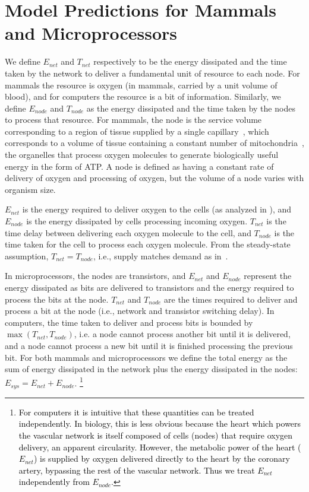 \documentclass[12pt]{article}
\newcommand{\red}[1]{\textcolor{black}{#1}}
\begin{document}
\section{Model Predictions for Mammals and Microprocessors}

We define $E_{net}$ and $T_{net}$ respectively to be the energy dissipated and
the time taken by the network to deliver a fundamental unit of resource to each node.  For
mammals the resource is oxygen (in mammals, carried by a unit volume of
blood), and for computers the resource is a bit of information.
Similarly, we define $E_{node}$ and $T_{node}$ as the energy dissipated and the
time taken by the nodes to process that resource.  For mammals, the node is
the service volume corresponding to a region of tissue supplied by a single
capillary~\cite{banavar10}, which corresponds to a volume of tissue containing a constant number
of mitochondria~\cite{west2002allometric}, the organelles that process oxygen molecules to generate
biologically useful energy in the form of ATP. A node is defined as having a constant
rate of delivery of oxygen and processing of oxygen, but the
volume of a node varies with organism size. 

$E_{net}$ is the energy required to deliver oxygen to the cells (as analyzed in
\cite{west97}), and $E_{node}$ is the energy dissipated by cells processing
incoming oxygen. $T_{net}$ is the time delay between delivering
each oxygen molecule to the cell, and $T_{node}$ is the time taken
for the cell to process each oxygen molecule. From the steady-state assumption, $T_{net} = T_{node}$,
i.e., supply matches demand as in~\cite{banavar10}.

In microprocessors, the nodes are transistors, and 
$E_{net}$ and $E_{node}$ represent the energy dissipated as bits are delivered
to transistors and the energy required to process the bits at the node.
$T_{net}$ and $T_{node}$ are the times required to deliver and process a bit at
the node (i.e., network and transistor switching delay).  In computers, the time
taken to deliver and process bits is bounded by $\max(T_{net},T_{node})$, i.e. a node cannot process another
bit until it is delivered, and a node cannot process a new bit until it is finished
processing the previous bit. For
both mammals and microprocessors we define the total energy as the sum of energy
dissipated in the network plus the energy dissipated in the nodes: $E_{sys} =
E_{net} + E_{node}$.  \footnote{\red{For computers it is intuitive that these quantities can be treated independently. In biology, this is less obvious because the heart which powers the vascular network is itself composed of cells (nodes) that require oxygen delivery, an apparent circularity. However, the metabolic power of the heart ($E_{net}$) is supplied by oxygen delivered directly to the heart by the coronary artery, bypassing the rest of the vascular network. Thus we treat $E_{net}$ independently from $E_{node}$.}}
\end{document}
